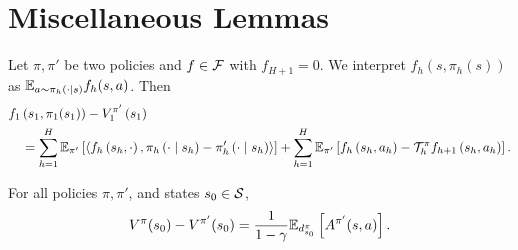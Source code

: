
\section{Miscellaneous Lemmas}


\begin{lem}
    Let $\pi,\pi'$ be two policies and $f\in{\mathcal{F}}$ with $f_{H+1}=0$. We interpret $f_h(s,\pi_h(s))$ as $\mathbb{E}_{a\sim\pi_h(\cdot\mid s)}f_h(s,a)$. Then
$$
\begin{aligned}
& f_1\left(s_1, \pi_1(s_1)\right)-V_1^{\pi^{\prime}}\left(s_1\right) \\
& \quad=\sum_{h=1}^H \mathbb{E}_{\pi^{\prime}}\left[\left\langle f_h\left(s_h, \cdot\right), \pi_h\left(\cdot \mid s_h\right)-\pi_h^{\prime}\left(\cdot \mid s_h\right)\right\rangle\right]+\sum_{h=1}^H \mathbb{E}_{\pi^{\prime}}\left[f_h\left(s_h, a_h\right)-{\mathcal{T}}_h^{\pi}f_{h+1}\left(s_h, a_h\right)\right] .
\end{aligned}
$$
\label{ch05:lem:policy-value-difference-lemma}
\end{lem}

\begin{lem}
    For all policies $\pi, \pi'$, and states $s_0 \in {\mathcal{S}}$,
    $$V^\pi(s_0) - V^{\pi'}(s_0) = \frac{1}{1-\gamma} \mathbb{E}_{d_{s_0}^\pi}\left[A^{\pi'}(s,a)\right].$$
    \label{lem:pdl}
\end{lem}

